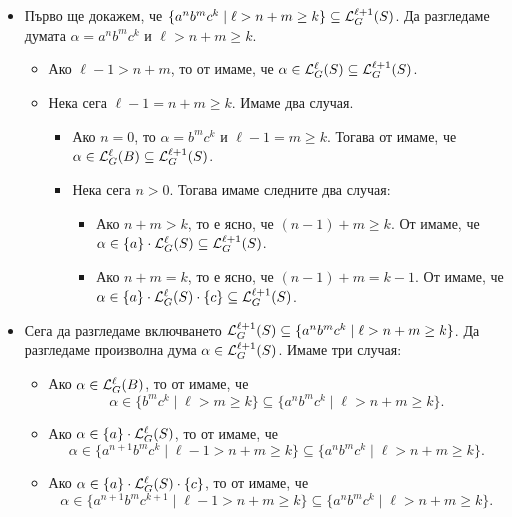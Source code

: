 {\begin{example}
  \begin{itemize}
  \item
    Първо ще докажем, че $\{a^nb^mc^k \mid \ell > n+m \geq k\} \subseteq \mathcal{L}^{\ell+1}_G(S)$.
    Да разгледаме думата $\alpha = a^nb^mc^k$ и $\ell > n+m \geq k$.
    \begin{itemize}
    \item
      Ако $\ell - 1 > n+m$, то от \IndHyp имаме, че $\alpha \in \mathcal{L}^{\ell}_G(S) \subseteq \mathcal{L}^{\ell+1}_G(S)$.
    \item
      Нека сега $\ell-1 = n+m \geq k$. Имаме два случая.
      \begin{itemize}
      \item
        Ако $n = 0$, то $\alpha = b^mc^k$ и $\ell-1 = m \geq k$. Тогава от \IndHyp имаме, че $\alpha \in \mathcal{L}^{\ell}_G(B) \subseteq \mathcal{L}^{\ell+1}_G(S)$.
      \item
        Нека сега $n > 0$. Тогава имаме следните два случая:
        \begin{itemize}
        \item 
          Ако $n + m > k$, то е ясно, че $(n-1) + m \geq k$. От \IndHyp имаме, че $\alpha \in \{a\} \cdot \mathcal{L}^\ell_G(S) \subseteq \mathcal{L}^{\ell+1}_G(S)$.
        \item
          Ако $n + m = k$, то е ясно, че $(n-1) + m = k-1$. От \IndHyp имаме, че $\alpha \in \{a\} \cdot \mathcal{L}^\ell_G(S) \cdot \{c\} \subseteq \mathcal{L}^{\ell+1}_G(S)$.
        \end{itemize}
      \end{itemize}
    \end{itemize}
  \item
    Сега да разгледаме включването $\mathcal{L}^{\ell+1}_G(S) \subseteq \{a^nb^mc^k \mid \ell > n+m \geq k\}$.
    Да разгледаме произволна дума $\alpha \in \mathcal{L}^{\ell+1}_G(S)$. Имаме три случая:
    \begin{itemize}
    \item
      Ако $\alpha \in \mathcal{L}^\ell_G(B)$, то от \IndHyp имаме, че
      \[\alpha \in \{b^mc^k \mid \ell > m \geq k\} \subseteq \{a^nb^mc^k \mid \ell > n+m \geq k\}.\]
    \item
      Ако $\alpha \in \{a\} \cdot \mathcal{L}^{\ell}_G(S)$, то от \IndHyp имаме, че
      \[\alpha \in \{a^{n+1}b^mc^k \mid \ell - 1 > n+m \geq k\} \subseteq \{a^nb^mc^k \mid \ell > n+m \geq k\}.\]
    \item
      Ако $\alpha \in \{a\} \cdot \mathcal{L}^{\ell}_G(S) \cdot \{c\}$, то от \IndHyp имаме, че
      \[\alpha \in \{a^{n+1}b^mc^{k+1} \mid \ell - 1 > n+m \geq k\} \subseteq \{a^nb^mc^k \mid \ell > n+m \geq k\}.\]
    \end{itemize}
  \end{itemize}


\end{example}}
